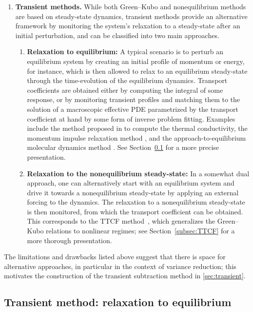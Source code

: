 \documentclass[11pt]{article}
\theoremstyle{definition}
\begin{document}
\begin{enumerate}
    \item {\bf Transient methods.} While both Green--Kubo and nonequilibrium methods are based on steady-state dynamics, transient methods provide an alternative framework by monitoring the system’s relaxation to a steady-state after an initial perturbation, and can be classified into two main approaches.
    
    \begin{enumerate}
    \item {\bf Relaxation to equilibrium:} A typical scenario is to perturb an equilibrium system by creating an initial profile of momentum or energy, for instance, which is then allowed to relax to an equilibrium steady-state through the time-evolution of the equilibrium dynamics. Transport coefficients are obtained either by computing the integral of some response, or by monitoring transient profiles and matching them to the solution of a macroscopic effective PDE parametrized by the transport coefficient at hand by some form of inverse problem fitting. Examples include the method proposed in \cite{hulse2005} to compute the thermal conductivity, the momentum impulse relaxation method \cite{arya2000}, and the approach-to-equilibrium molecular dynamics method \cite{lampin2013}. See Section~\ref{subsec:transient} for a more precise presentation.
                
        \item {\bf Relaxation to the nonequilibrium steady-state:} In a somewhat dual approach, one can alternatively start with an equilibrium system and drive it towards a nonequilibrium steady-state by applying an external forcing to the dynamics. The relaxation to a nonequilibrium steady-state is then monitored, from which the transport coefficient can be obtained. This corresponds to the TTCF method~\cite{morriss1987,evans1988}, which generalizes the Green--Kubo relations to nonlinear regimes; see Section~\ref{subsec:TTCF} for a more thorough presentation.
    \end{enumerate}
\end{enumerate}
The limitations and drawbacks listed above suggest that there is space for alternative approaches, in particular in the context of variance reduction; this motivates the construction of the transient subtraction method in \cref{sec:transient}.

\subsection{Transient method: relaxation to equilibrium}
\label{subsec:transient}
\end{document}
